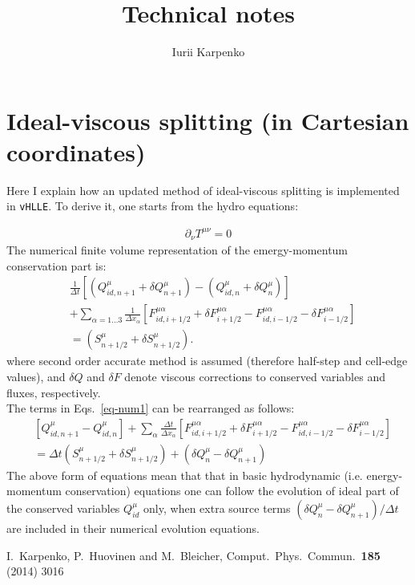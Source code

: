 \documentclass{article}
\title{Technical notes}
\author{Iurii Karpenko}
\newcommand{\dd}{\partial}
\begin{document}
\maketitle

\section{Ideal-viscous splitting (in Cartesian coordinates)}

Here I explain how an updated method of ideal-viscous splitting is implemented in \texttt{vHLLE}. To derive it, one starts from the hydro equations:

 \begin{align}\label{eqns1}
 \dd_\nu T^{\mu\nu}=0
 \end{align}
The numerical finite volume representation of the emergy-momentum conservation part is:
\begin{align}\label{eq-num1}
&\frac{1}{\Delta t}\left[ (Q^\mu_{id,n+1}+\delta Q^\mu_{n+1}) - (Q^\mu_{id,n}+\delta Q^\mu_n) \right] \nonumber\\
&+\sum_{\alpha=1...3}\frac{1}{\Delta x_\alpha}\left[ F^{\mu\alpha}_{id,i+1/2}+\delta F^{\mu\alpha}_{i+1/2} - F^{\mu\alpha}_{id,i-1/2}-\delta F^{\mu\alpha}_{i-1/2} \right] \nonumber\\
&=(S^\mu_{n+1/2}+\delta S^\mu_{n+1/2}).
\end{align}
where second order accurate method is assumed (therefore half-step and cell-edge values), and $\delta Q$ and $\delta F$ denote viscous corrections to conserved variables and fluxes, respectively.\\
The terms in Eqs.~\ref{eq-num1} can be rearranged as follows:
\begin{align}
&\left[ Q^\mu_{id,n+1} - Q^\mu_{id,n} \right]
+\sum_{\alpha}\frac{\Delta t}{\Delta x_\alpha}\left[ F^{\mu\alpha}_{id,i+1/2}+\delta F^{\mu\alpha}_{i+1/2} - F^{\mu\alpha}_{id,i-1/2}-\delta F^{\mu\alpha}_{i-1/2} \right] \nonumber\\
&=\Delta t(S^\mu_{n+1/2}+\delta S^\mu_{n+1/2}) + (\delta Q^\mu_n - \delta Q^\mu_{n+1})
\end{align}
The above form of equations mean that that in basic hydrodynamic (i.e. energy-momentum conservation) equations one can follow the evolution of ideal part of the conserved variables $Q_{id}^\mu$ only, when extra source terms $(\delta Q^\mu_n - \delta Q^\mu_{n+1})/\Delta t$ are included in their numerical evolution equations.

\begin{thebibliography}{0}
  I.~Karpenko, P.~Huovinen and M.~Bleicher,
  Comput.\ Phys.\ Commun.\  {\bf 185} (2014) 3016
\end{thebibliography}
\end{document}
